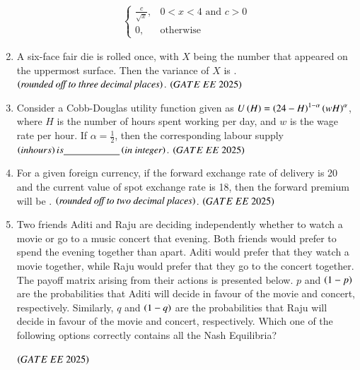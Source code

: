\documentclass[journal,12pt,onecolumn]{IEEEtran}
\theoremstyle{remark}
\begin{document}
\begin{enumerate}
\begin{align}
\begin{cases}
    \frac{c}{\sqrt{x}}, & 0 < x < 4\text{ and } c > 0 \\
    0, & \text{otherwise}
  \end{cases}
 \end{align}
\item A six-face fair die is rolled once, with $X$ being the number that appeared on the uppermost surface. Then the variance of $X$ is \underline{\hspace{2cm}}.  $\left(\textit{rounded off to three decimal places}\right)$.
 \hfill $\brak{GATE\ EE\ 2025}$
\item Consider a Cobb-Douglas utility function given as $U \left(H\right) =  \left(24-H\right)^{1-\alpha} \left(wH\right)^\alpha$, where $H$ is the number of hours spent working per day, and $w$ is the wage rate per hour. If $\alpha = \frac{1}{2}$, then the corresponding labour supply  $\left(in hours\right) is \underline{\hspace{2cm}}  \left(\textit{in integer}\right)$.
 \hfill $\brak{GATE\ EE\ 2025}$
\item For a given foreign currency, if the forward exchange rate of delivery is 20 and the current value of spot exchange rate is 18, then the forward premium will be \underline{\hspace{2cm}}.  $\left(\textit{rounded off to two decimal places}\right)$.
 \hfill $\brak{GATE\ EE\ 2025}$
\item Two friends Aditi and Raju are deciding independently whether to watch a movie or go to a music concert that evening. Both friends would prefer to spend the evening together than apart. Aditi would prefer that they watch a movie together, while Raju would prefer that they go to the concert together. The payoff matrix arising from their actions is presented below. $p$ and $ \left(1-p\right)$ are the probabilities that Aditi will decide in favour of the movie and concert, respectively. Similarly, $q$ and $ \left(1-q\right)$ are the probabilities that Raju will decide in favour of the movie and concert, respectively. Which one of the following options correctly contains all the Nash Equilibria?

\hfill $\brak{GATE\ EE\ 2025}$
\begin{enumerate}
\end{enumerate}
\end{enumerate}
\end{document}

